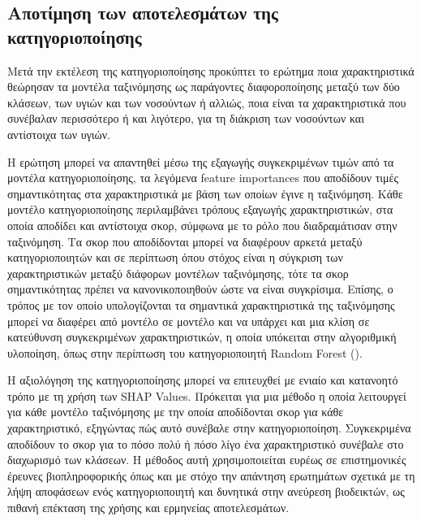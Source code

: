 \documentclass[12pt]{report}
\begin{document}
        \subsection{Αποτίμηση των αποτελεσμάτων της κατηγοριοποίησης}
            Μετά την εκτέλεση της κατηγοριοποίησης προκύπτει το ερώτημα ποια χαρακτηριστικά θεώρησαν τα μοντέλα ταξινόμησης ως παράγοντες διαφοροποίησης μεταξύ των δύο κλάσεων, των υγιών και των νοσούντων ή αλλιώς, ποια είναι τα χαρακτηριστικά που συνέβαλαν περισσότερο ή και λιγότερο, για τη διάκριση των νοσούντων και αντίστοιχα των υγιών.
        \par
            Η ερώτηση μπορεί να απαντηθεί μέσω της εξαγωγής συγκεκριμένων τιμών από τα μοντέλα κατηγοριοποίησης, τα λεγόμενα feature importances που αποδίδουν τιμές σημαντικότητας στα χαρακτηριστικά με βάση των οποίων έγινε η ταξινόμηση. Κάθε μοντέλο κατηγοριοποίησης περιλαμβάνει τρόπους εξαγωγής χαρακτηριστικών, στα οποία αποδίδει και αντίστοιχα σκορ, σύμφωνα με το ρόλο που διαδραμάτισαν στην ταξινόμηση. Τα σκορ που αποδίδονται μπορεί να διαφέρουν αρκετά μεταξύ κατηγοριοποιητών και σε περίπτωση όπου στόχος είναι η σύγκριση των χαρακτηριστικών μεταξύ διάφορων μοντέλων ταξινόμησης, τότε τα σκορ σημαντικότητας πρέπει να κανονικοποιηθούν ώστε να είναι συγκρίσιμα. Επίσης, ο τρόπος με τον οποίο υπολογίζονται τα σημαντικά χαρακτηριστικά της ταξινόμησης μπορεί να διαφέρει από μοντέλο σε μοντέλο και να υπάρχει και μια κλίση σε κατεύθυνση συγκεκριμένων χαρακτηριστικών, η οποία υπόκειται στην αλγοριθμική υλοποίηση, όπως στην περίπτωση του κατηγοριοποιητή Random Forest (\emph{\cite{Strobl2007BiasSolution}}).
        \par
            Η αξιολόγηση της κατηγοριοποίησης μπορεί να επιτευχθεί με ενιαίο και κατανοητό τρόπο με τη χρήση των SHAP Values. Πρόκειται για μια μέθοδο η οποία λειτουργεί για κάθε μοντέλο ταξινόμησης με την οποία αποδίδονται σκορ για κάθε χαρακτηριστικό, εξηγώντας πώς αυτό συνέβαλε στην κατηγοριοποίηση. Συγκεκριμένα αποδίδουν το σκορ για το πόσο πολύ ή πόσο λίγο ένα χαρακτηριστικό συνέβαλε στο διαχωρισμό των κλάσεων. Η μέθοδος αυτή χρησιμοποιείται ευρέως σε επιστημονικές έρευνες βιοπληροφορικής όπως \cite{Meral2025Fine-TunedAnalysis} και \cite{FilaliRazzouki2025ExplainingDisease} με στόχο την απάντηση ερωτημάτων σχετικά με τη λήψη αποφάσεων ενός κατηγοριοποιητή και δυνητικά στην ανεύρεση βιοδεικτών, ως πιθανή επέκταση της χρήσης και ερμηνείας αποτελεσμάτων.
        \par
\end{document}
